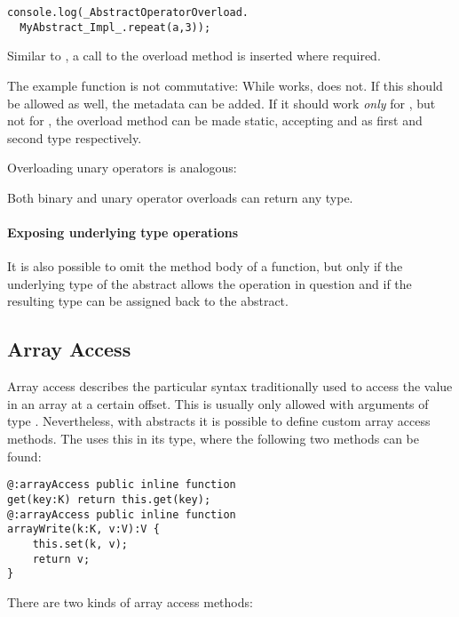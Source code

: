{\begin{lstlisting}
console.log(_AbstractOperatorOverload.
  MyAbstract_Impl_.repeat(a,3));
\end{lstlisting}
Similar to , a call to the overload method is inserted where required.

The example  function is not commutative: While  works,  does not. If this should be allowed as well, the  metadata can be added. If it should work \emph{only} for , but not for , the overload method can be made static, accepting  and  as first and second type respectively.

Overloading unary operators is analogous:

Both binary and unary operator overloads can return any type.

\paragraph{Exposing underlying type operations}

It is also possible to omit the method body of a  function, but only if the underlying type of the abstract allows the operation in question and if the resulting type can be assigned back to the abstract.




\subsection{Array Access}
\label{types-abstract-array-access}

Array access describes the particular syntax traditionally used to access the value in an array at a certain offset. This is usually only allowed with arguments of type . Nevertheless, with abstracts it is possible to define custom array access methods. The  uses this in its  type, where the following two methods can be found:

\begin{lstlisting}
@:arrayAccess public inline function
get(key:K) return this.get(key);
@:arrayAccess public inline function
arrayWrite(k:K, v:V):V {
	this.set(k, v);
	return v;
}
\end{lstlisting}
There are two kinds of array access methods:

}
